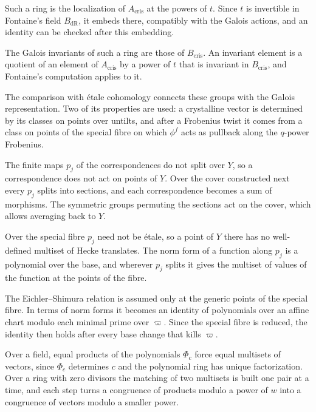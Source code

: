 Such a ring is the localization of $A_{\mathrm{cris}}$ at the powers of $t$. Since $t$ is invertible in
Fontaine's field $B_{\mathrm{dR}}$, it embeds there, compatibly with the Galois actions, and an identity can be
checked after this embedding.

The Galois invariants of such a ring are those of $B_{\mathrm{cris}}$. An invariant element is a quotient of an
element of $A_{\mathrm{cris}}$ by a power of $t$ that is invariant in $B_{\mathrm{cris}}$, and Fontaine's
computation applies to it.

The comparison with \'etale cohomology connects these groups with the Galois representation. Two of
its properties are used: a crystalline vector is determined by its classes on points over untilts, and
after a Frobenius twist it comes from a class on points of the special fibre on which $\phi^f$ acts as
pullback along the $q$-power Frobenius.

The finite maps $p_j$ of the correspondences do not split over $Y$, so a correspondence does not act on
points of $Y$. Over the cover constructed next every $p_j$ splits into sections, and each correspondence
becomes a sum of morphisms. The symmetric groups permuting the sections act on the cover, which allows
averaging back to $Y$.

Over the special fibre $p_j$ need not be \'etale, so a point of $Y$ there has no well-defined multiset of
Hecke translates. The norm form of a function along $p_j$ is a polynomial over the base, and wherever
$p_j$ splits it gives the multiset of values of the function at the points of the fibre.

The Eichler--Shimura relation is assumed only at the generic points of the special fibre. In terms of
norm forms it becomes an identity of polynomials over an affine chart modulo each minimal prime over
$\varpi$. Since the special fibre is reduced, the identity then holds after every base change that kills
$\varpi$.

Over a field, equal products of the polynomials $\Phi_c$ force equal multisets of vectors, since $\Phi_c$
determines $c$ and the polynomial ring has unique factorization. Over a ring with zero divisors the
matching of two multisets is built one pair at a time, and each step turns a congruence of products
modulo a power of $w$ into a congruence of vectors modulo a smaller power.

